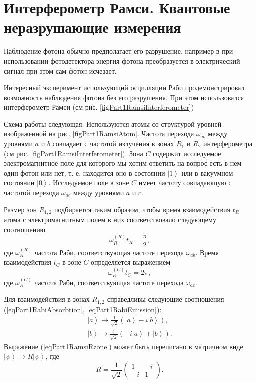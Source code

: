 \section{Интерферометр Рамси. Квантовые неразрушающие измерения}

Наблюдение фотона обычно предполагает его разрушение, например в
при использовании фотодетектора энергия фотона преобразуется в
электрический сигнал при этом сам фотон исчезает.

Интересный эксперимент \cite{Nogues1999Nv400p239} использующий
осцилляции Раби продемонстрировал возможность наблюдения фотона без
его разрушения. При этом использовался интерферометр Рамси (см
рис. \ref{figPart1RamsiInterferometer})





Схема работы следующая. Используются атомы со структурой уровней
изображенной на рис. \ref{figPart1RamsiAtom}. Частота перехода
$\omega_{ab}$ между уровнями $a$ и $b$ совпадает с частотой излучения
в зонах $R_1$ и $R_2$ интерферометра  (см
рис. \ref{figPart1RamsiInterferometer}). Зона $C$ содержит исследуемое
электромагнитное поле для которого мы хотим ответить на вопрос есть в
нем один фотон или нет, т. е. находится оно в состоянии
$\left|1\right>$ или в вакуумном состоянии
$\left|0\right>$. Исследуемое поле в зоне $C$ имеет частоту
совпадающую с частотой перехода $\omega_{ac}$ между уровнями $a$ и
$c$.  

Размер зон $R_{1,2}$ подбирается таким образом, чтобы время
взаимодействия $t_R$ атома с электромагнитным полем в них соответствовало
следующему соотношению
\begin{equation}
  \omega_R^{(R)} t_R = \frac{\pi}{2},
  \nonumber
\end{equation}
где $\omega_R^{(R)}$ частота Раби, соответствующая частоте перехода
$\omega_{ab}$.
Время взаимодействия $t_C$ в зоне $C$ определяется выражением
\begin{equation}
  \omega_R^{(C)} t_C = 2 \pi,
  \nonumber
\end{equation}
где $\omega_R^{(C)}$ частота Раби, соответствующая частоте перехода
$\omega_{ac}$.

Для взаимодействия в зонах $R_{1,2}$ справедливы следующие
соотношения (\ref{eqPart1RabiAbsorbtion}, \ref{eqPart1RabiEmission}):
\begin{eqnarray}
  \left|a\right> \rightarrow \frac{1}{\sqrt{2}}\left(
  \left|a\right> - i \left|b\right>  
  \right),
  \nonumber \\
  \left|b\right> \rightarrow \frac{1}{\sqrt{2}}\left(
  -i \left|a\right> + \left|b\right>  
  \right).
  \label{eqPart1RamsiRzone}
\end{eqnarray}
Выражение (\ref{eqPart1RamsiRzone}) может быть переписано в матричном
виде $\left|\psi\right> \rightarrow R \left|\psi\right>$,
где
\[
R = \frac{1}{\sqrt{2}} \left(
\begin{array} {cc}
1 & -i
\\
-i & 1 
\end{array}
\right).
\]

